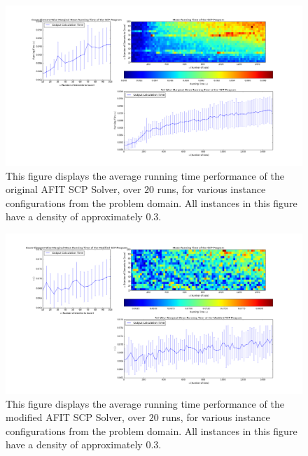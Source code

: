\documentclass[12pt]{article}
\begin{document}
\begin{figure}[ht!]\label{fig:runtime_analysis_original_density0p3}
	
	\centering
	\centerline{\includegraphics[width = 6.7in]{running_time_original_density0p3.png}}
	\hfill
	
	\caption{This figure displays the average running time performance of the original AFIT SCP Solver, over $20$ runs, for various instance configurations from the problem domain. All instances in this figure have a density of approximately $0.3$.}
	
\end{figure}

\begin{figure}[ht!]\label{fig:runtime_analysis_modified_density0p3}
	
	\centering
	\centerline{\includegraphics[width = 6.7in]{running_time_modified_density0p3_noout_noH1.png}}
	\hfill
	
	\caption{This figure displays the average running time performance of the modified AFIT SCP Solver, over $20$ runs, for various instance configurations from the problem domain. All instances in this figure have a density of approximately $0.3$.}
	
\end{figure}
\end{document}
